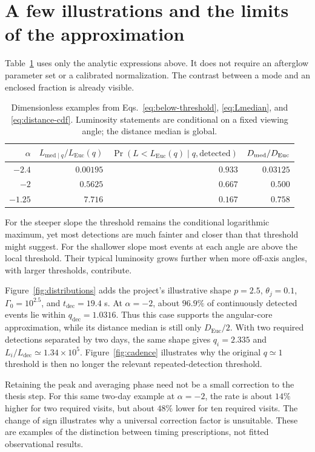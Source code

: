\documentclass[11pt,a4paper]{article}
\newcommand{\Euc}{\mathrm{Euc}}
\newcommand{\dec}{\mathrm{dec}}
\newcommand{\Ldec}{L_{\mathrm{dec}}}
\newcommand{\tdec}{t_{\mathrm{dec}}}
\begin{document}
\section{A few illustrations and the limits of the approximation}
\label{sec:examples}
Table~\ref{tab:illustrations} uses only the analytic expressions above.
It does not require an afterglow parameter set or a calibrated normalization.
The contrast between a mode and an enclosed fraction is already visible.
\begin{table}[H]
\centering
\caption{Dimensionless examples from Eqs.~\eqref{eq:below-threshold},
\eqref{eq:Lmedian}, and \eqref{eq:distance-cdf}. Luminosity statements are
conditional on a fixed viewing angle; the distance median is global.}
\label{tab:illustrations}
\begin{tabular}{@{}rrrr@{}}
\toprule
$\alpha$ & $L_{\mathrm{med}\mid q}/L_\Euc(q)$
 & $\Pr(L<L_\Euc(q)\mid q,\mathrm{detected})$ & $D_{\rm med}/D_\Euc$\\
\midrule
$-2.4$ & $0.00195$ & $0.933$ & $0.03125$\\
$-2$   & $0.5625$  & $0.667$ & $0.500$\\
$-1.25$ & $7.716$ & $0.167$ & $0.758$\\
\bottomrule
\end{tabular}
\end{table}
For the steeper slope the threshold remains the conditional logarithmic
maximum, yet most detections are much fainter and closer than that threshold
might suggest. For the shallower slope most events at each angle are above
the local threshold. Their typical luminosity grows further when more
off-axis angles, with larger thresholds, contribute.

Figure~\ref{fig:distributions} adds the project's illustrative shape
$p=2.5$, $\theta_j=0.1$, $\Gamma_0=10^{2.5}$, and $\tdec=19.4$ s.
At $\alpha=-2$, about $96.9\%$ of continuously detected events lie within
$q_\dec=1.0316$. Thus this case supports the angular-core approximation,
while its distance median is still only $D_\Euc/2$.
With two required detections separated by two days, the same shape gives
$q_i=2.335$ and $L_i/\Ldec\simeq1.34\times10^5$.
Figure~\ref{fig:cadence} illustrates why the original $q\simeq1$ threshold
is then no longer the relevant repeated-detection threshold.


Retaining the peak and averaging phase need not be a small correction to
the thesis step. For this same two-day example at $\alpha=-2$, the rate is
about $14\%$ higher for two required visits, but about $48\%$ lower for ten
required visits. The change of sign illustrates why a universal correction
factor is unsuitable. These are examples of the distinction between timing
prescriptions, not fitted observational results.
\end{document}
